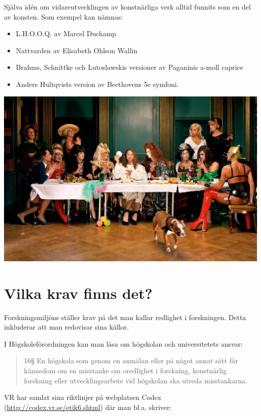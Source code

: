 \documentclass{article}
\begin{document}
Själva idén om vidareutvecklingen av konstnärliga verk alltid funnits som en del av konsten. Som exempel kan nämnas:

\begin{itemize}
\item L.H.O.O.Q. av Marcel Duchamp
\item Nattvarden av Elisabeth Ohlson Wallin
\item Brahms, Schnittke och Lutoslawskis versioner av Paganinis a-moll caprice
\item Anders Hultqvists version av Beethovens 5e symfoni.
\end{itemize}

\includegraphics[]{./img/nattvard.jpg}

\section{Vilka krav finns det?}
Forskningsmiljöns ställer krav på det man kallar redlighet i forskningen. Detta inkluderar att man redovisar sina källor.

I Högskoleförordningen kan man läsa om högskolan och universitetets ansvar:

\begin{quote}
  16§ En högskola som genom en anmälan eller på något annat sätt får
  kännedom om en misstanke om oredlighet i forskning, konstnärlig
  forskning eller utvecklingsarbete vid högskolan ska utreda
  misstankarna.
\end{quote}

VR har samlat sina riktlinjer på webplatsen Codex (\url{http://codex.vr.se/etik6.shtml}) där man bl.a. skriver:
\end{document}
